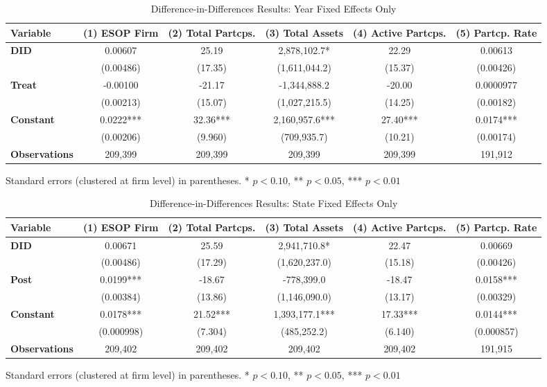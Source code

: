 \documentclass[12pt]{article}
\begin{document}
\begin{table}[H]
\centering
\caption{Difference-in-Differences Results: Year Fixed Effects Only}
\label{tab:model2}
\footnotesize
\begin{tabular}{lcccc|c}
\toprule
Variable & (1) ESOP Firm & (2) Total Partcps. & (3) Total Assets & (4) Active Partcps. & (5) Partcp. Rate \\
\midrule
\textbf{DID} & 0.00607 & 25.19 & 2,878,102.7* & 22.29 & 0.00613 \\
 & (0.00486) & (17.35) & (1,611,044.2) & (15.37) & (0.00426) \\
\textbf{Treat} & -0.00100 & -21.17 & -1,344,888.2 & -20.00 & 0.0000977 \\
 & (0.00213) & (15.07) & (1,027,215.5) & (14.25) & (0.00182) \\
\textbf{Constant} & 0.0222*** & 32.36*** & 2,160,957.6*** & 27.40*** & 0.0174*** \\
 & (0.00206) & (9.960) & (709,935.7) & (10.21) & (0.00174) \\
\midrule
\textbf{Observations} & 209,399 & 209,399 & 209,399 & 209,399 & 191,912 \\
\bottomrule
\end{tabular}

\vspace{0.5em}
{\footnotesize Standard errors (clustered at firm level) in parentheses. * $p<0.10$, ** $p<0.05$, *** $p<0.01$}
\end{table}

\begin{table}[H]
\centering
\caption{Difference-in-Differences Results: State Fixed Effects Only}
\label{tab:model3}
\footnotesize
\begin{tabular}{lcccc|c}
\toprule
Variable & (1) ESOP Firm & (2) Total Partcps. & (3) Total Assets & (4) Active Partcps. & (5) Partcp. Rate \\
\midrule
\textbf{DID} & 0.00671 & 25.59 & 2,941,710.8* & 22.47 & 0.00669 \\
 & (0.00486) & (17.29) & (1,620,237.0) & (15.18) & (0.00426) \\
\textbf{Post} & 0.0199*** & -18.67 & -778,399.0 & -18.47 & 0.0158*** \\
 & (0.00384) & (13.86) & (1,146,090.0) & (13.17) & (0.00329) \\
\textbf{Constant} & 0.0178*** & 21.52*** & 1,393,177.1*** & 17.33*** & 0.0144*** \\
 & (0.000998) & (7.304) & (485,252.2) & (6.140) & (0.000857) \\
\midrule
\textbf{Observations} & 209,402 & 209,402 & 209,402 & 209,402 & 191,915 \\
\bottomrule
\end{tabular}

\vspace{0.5em}
{\footnotesize Standard errors (clustered at firm level) in parentheses. * $p<0.10$, ** $p<0.05$, *** $p<0.01$}
\end{table}
\end{document}
